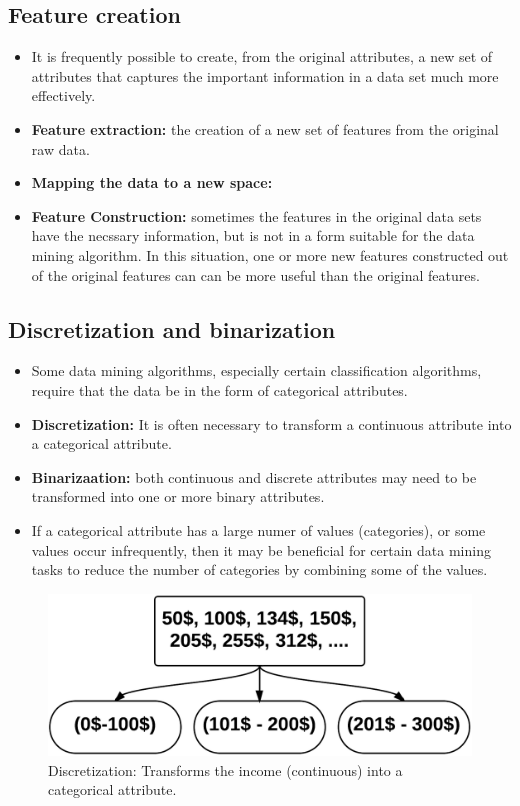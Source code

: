 	\subsection{Feature creation}
		\begin{itemize}
			\item It is frequently possible to create, from the original attributes, a new set
			of attributes that captures the important information in a data set much more
			effectively. 
			\item {\bf Feature extraction:} the creation of a new set of features from the 
			original raw data. 
			\item {\bf Mapping the data to a new space:} 
			\item {\bf Feature Construction: } sometimes the features in the original data sets have
			the necssary information, but is not in a form suitable for the data mining algorithm.
			In this situation, one or more new features constructed out of the original features can
			can be more useful than the original features. 
		\end{itemize}

	\subsection{Discretization and binarization}
		\begin{itemize}
			\item Some data mining algorithms, especially certain classification algorithms, 
			require that the data be in the form of categorical attributes. 
			\item {\bf Discretization:} It is often necessary to transform a continuous attribute into a categorical attribute.
			\item {\bf Binarizaation:} both continuous and discrete attributes may need to be 
			transformed into one or more binary attributes.
			\item If a categorical attribute has a large numer of values (categories), or some
			values occur infrequently, then it may be beneficial for certain data mining tasks
			to reduce the number of categories by combining some of the values. 
		\end{itemize}

		\begin{figure}[H]
			\centering
			\includegraphics[scale=0.25]{pics/discretization.png}
			\caption{Discretization: Transforms the income (continuous) into a categorical attribute.}
		\end{figure}

